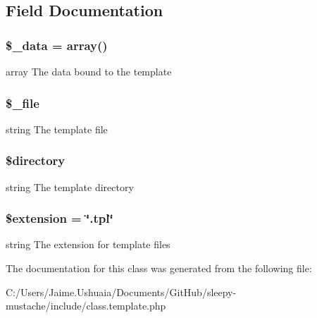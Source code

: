 \subsection{Field Documentation}
\hypertarget{class_template_a5a3006290f2de94fff2dd63ca739d15a}{
\subsubsection[{\$\-\_\-data}]{\setlength{\rightskip}{0pt plus 5cm}\$\-\_\-data = array()\hspace{0.3cm}{\ttfamily [protected]}}}\label{class_template_a5a3006290f2de94fff2dd63ca739d15a}
array The data bound to the template \hypertarget{class_template_abddaf0b77086e2b7d920f5d1a9616889}{
\subsubsection[{\$\-\_\-file}]{\setlength{\rightskip}{0pt plus 5cm}\$\-\_\-file\hspace{0.3cm}{\ttfamily [protected]}}}\label{class_template_abddaf0b77086e2b7d920f5d1a9616889}
string The template file \hypertarget{class_template_a1b07c630eb02f770a082a013373a16d6}{
\subsubsection[{\$directory}]{\setlength{\rightskip}{0pt plus 5cm}\$directory}}\label{class_template_a1b07c630eb02f770a082a013373a16d6}
string The template directory \hypertarget{class_template_aed02cd2cd0ee08bd99a2ac1ef4f955ce}{
\subsubsection[{\$extension}]{\setlength{\rightskip}{0pt plus 5cm}\$extension = \char`\"{}.tpl\char`\"{}}}\label{class_template_aed02cd2cd0ee08bd99a2ac1ef4f955ce}
string The extension for template files 

The documentation for this class was generated from the following file\-:\begin{DoxyCompactItemize}
\item 
C\-:/\-Users/\-Jaime.\-Ushuaia/\-Documents/\-Git\-Hub/sleepy-\/mustache/include/class.\-template.\-php\end{DoxyCompactItemize}
